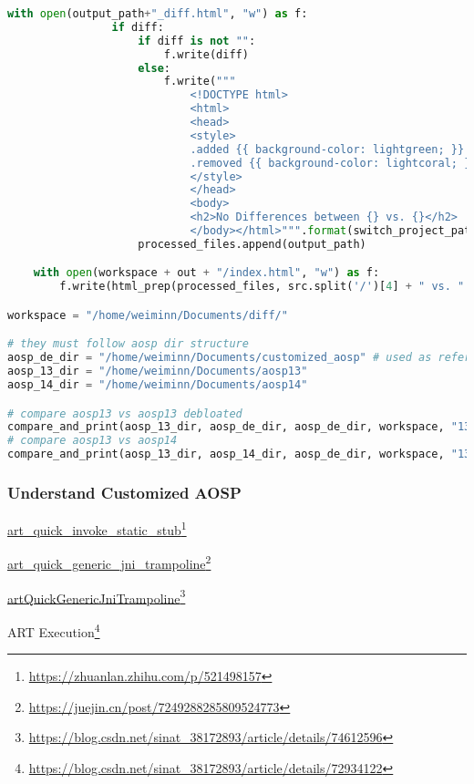 \begin{lstlisting}[language=python]
            with open(output_path+"_diff.html", "w") as f:
                if diff:
                    if diff is not "":
                        f.write(diff)
                    else:
                        f.write("""
                            <!DOCTYPE html>
                            <html>
                            <head>
                            <style>
                            .added {{ background-color: lightgreen; }}
                            .removed {{ background-color: lightcoral; }}
                            </style>
                            </head>
                            <body>
                            <h2>No Differences between {} vs. {}</h2>
                            </body></html>""".format(switch_project_path(f, src.split('/')[4]), switch_project_path(f, tgt.split('/')[4])))
                    processed_files.append(output_path)

    with open(workspace + out + "/index.html", "w") as f:
        f.write(html_prep(processed_files, src.split('/')[4] + " vs. " + tgt.split('/')[4] + " Differenced", workspace, out))

workspace = "/home/weiminn/Documents/diff/"

# they must follow aosp dir structure
aosp_de_dir = "/home/weiminn/Documents/customized_aosp" # used as reference on what to compare
aosp_13_dir = "/home/weiminn/Documents/aosp13"
aosp_14_dir = "/home/weiminn/Documents/aosp14"

# compare aosp13 vs aosp13 debloated
compare_and_print(aosp_13_dir, aosp_de_dir, aosp_de_dir, workspace, "13vs13debloat")
# compare aosp13 vs aosp14
compare_and_print(aosp_13_dir, aosp_14_dir, aosp_de_dir, workspace, "13vs14")

\end{lstlisting}

\subsubsection{Understand Customized AOSP}

\url{art_quick_invoke_static_stub}\footnote{\url{https://zhuanlan.zhihu.com/p/521498157}}

\url{art_quick_generic_jni_trampoline}\footnote{\url{https://juejin.cn/post/7249288285809524773}}

\url{artQuickGenericJniTrampoline}\footnote{\url{https://blog.csdn.net/sinat_38172893/article/details/74612596}}

ART Execution\footnote{\url{https://blog.csdn.net/sinat_38172893/article/details/72934122}}


